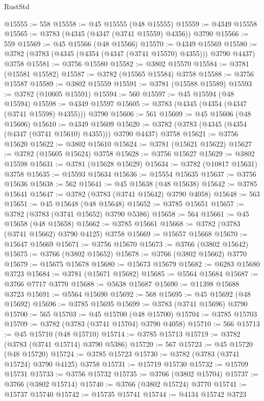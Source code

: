 \begin{lexlean}{RustStd}
\begin{coremodule}
@15555 := 558
@15558 := @45 @15555 (@48 @15555)
@15559 := @4349 @15558
@15565 := @3783 (@4345 (@4347 (@3741 @15559) @4356)) @3790
@15566 := 559
@15569 := @45 @15566 (@48 @15566)
@15570 := @4349 @15569
@15580 := @3782 (@3783 (@4345 (@4354 (@4347 (@3741 @15570) @4355))) @3790 @4437) @3758
@15581 := @3756 @15580
@15582 := @3802 @15570
@15584 := @3781 (@15581 @15582)
@15587 := @3782 (@15565 @15584) @3758
@15588 := @3756 @15587
@15589 := @3802 @15559
@15591 := @3781 (@15588 @15589)
@15593 := @3782 (@10605 @15591)
@15594 := 560
@15597 := @45 @15594 (@48 @15594)
@15598 := @4349 @15597
@15605 := @3783 (@4345 (@4354 (@4347 (@3741 @15598) @4355))) @3790
@15606 := 561
@15609 := @45 @15606 (@48 @15606)
@15610 := @4349 @15609
@15620 := @3782 (@3783 (@4345 (@4354 (@4347 (@3741 @15610) @4355))) @3790 @4437) @3758
@15621 := @3756 @15620
@15622 := @3802 @15610
@15624 := @3781 (@15621 @15622)
@15627 := @3782 (@15605 @15624) @3758
@15628 := @3756 @15627
@15629 := @3802 @15598
@15631 := @3781 (@15628 @15629)
@15634 := @3782 (@10817 @15631) @3758
@15635 := @15593 @15634
@15636 := @15554 @15635
@15637 := @3756 @15636
@15638 := 562
@15641 := @45 @15638 (@48 @15638)
@15642 := @3785 @15641
@15647 := @3782 (@3783 (@3741 @15642) @3790 @4058)
@15648 := 563
@15651 := @45 @15648 (@48 @15648)
@15652 := @3785 @15651
@15657 := @3782 (@3783 (@3741 @15652) @3790 @5386)
@15658 := 564
@15661 := @45 @15658 (@48 @15658)
@15662 := @3785 @15661
@15668 := @3782 (@3783 (@3741 @15662) @3790 @4125) @3758
@15669 := @15657 @15668
@15670 := @15647 @15669
@15671 := @3756 @15670
@15673 := @3766 (@3802 @15642)
@15675 := @3766 (@3802 @15652)
@15678 := @3766 (@3802 @15662) @3770
@15679 := @15675 @15678
@15680 := @15673 @15679
@15682 := @6283 @15680 @3723
@15684 := @3781 (@15671 @15682)
@15685 := @5564 @15684
@15687 := @3766 @7717 @3770
@15688 := @5638 @15687
@15690 := @11398 @15688 @3723
@15691 := @5564 @15690
@15692 := 568
@15695 := @45 @15692 (@48 @15692)
@15696 := @3785 @15695
@15699 := @3783 (@3741 @15696) @3790
@15700 := 565
@15703 := @45 @15700 (@48 @15700)
@15704 := @3785 @15703
@15709 := @3782 (@3783 (@3741 @15704) @3790 @4058)
@15710 := 566
@15713 := @45 @15710 (@48 @15710)
@15714 := @3785 @15713
@15719 := @3782 (@3783 (@3741 @15714) @3790 @5386)
@15720 := 567
@15723 := @45 @15720 (@48 @15720)
@15724 := @3785 @15723
@15730 := @3782 (@3783 (@3741 @15724) @3790 @4125) @3758
@15731 := @15719 @15730
@15732 := @15709 @15731
@15733 := @3756 @15732
@15735 := @3766 (@3802 @15704)
@15737 := @3766 (@3802 @15714)
@15740 := @3766 (@3802 @15724) @3770
@15741 := @15737 @15740
@15742 := @15735 @15741
@15744 := @4134 @15742 @3723

\end{coremodule}
\end{lexlean}
